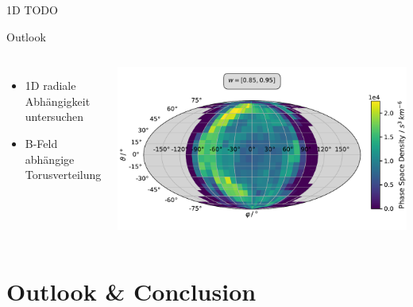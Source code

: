 \documentclass{beamer}
\begin{document}

\begin{frame}{1D}
TODO
\end{frame}


\begin{frame}{Outlook}

\begin{columns}
	\column{5.8cm}
\begin{itemize}
	\item 1D radiale Abhängigkeit untersuchen
	\item B-Feld abhängige Torusverteilung
\end{itemize}
	\column{10cm}
	
	\includegraphics[scale=.21]{Pics/sky_ps.pdf}
\end{columns}






\end{frame}



\section{Outlook \& Conclusion}
\end{document}
